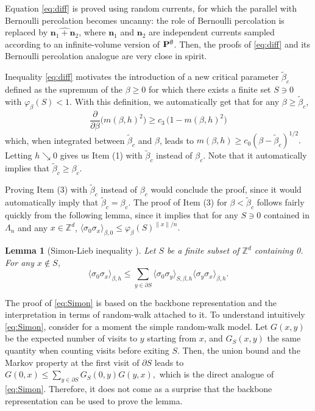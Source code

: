 \documentclass[a4paper,oneside,11pt]{article}
\newtheorem{lemma}[theorem]{Lemma}
\newcommand{\ee}{\end{equation}}
\newcommand{\be}{\begin{equation}}
\begin{document}
Equation \eqref{eq:diff} is proved using random currents, for which the parallel with Bernoulli percolation becomes uncanny: the role of Bernoulli percolation is replaced by $\widehat{\mathbf n_1+\mathbf n_2}$, where $\mathbf n_1$ and $\mathbf n_2$ are independent currents sampled according to an infinite-volume version of ${\bf P}^\emptyset$. Then, the proofs of \eqref{eq:diff} and its Bernoulli percolation analogue \cite[(1.3)]{DumTas15} are very close in spirit.

Inequality \eqref{eq:diff} motivates the introduction of a new critical parameter $\tilde\beta_c$ defined as the supremum of the $\beta\ge0$ for which there exists a finite set $S\ni0$ with $\varphi_\beta(S)<1$. With this definition, we automatically get that for any $\beta\ge \tilde\beta_c$,
\be\label{eq;diff}
\frac{\partial}{\partial \beta}\big(m(\beta,h)^2\big)\ge c_3\,\big(1-m(\beta,h)^2\big)
\ee
which, when integrated between $\tilde \beta_c$ and $\beta$, leads to 
$
m(\beta,h)\ge c_0(\beta-\tilde\beta_c)^{1/2}.
$
Letting $h\searrow 0$ gives us Item (1) with $\tilde\beta_c$ instead of $\beta_c$. Note that it automatically implies that $\tilde\beta_c\ge \beta_c$. 

Proving Item (3) with $\tilde \beta_c$ instead of $\beta_c$ would conclude the proof, since it would automatically imply that $\tilde\beta_c=\beta_c$. The proof of Item (3) for $\beta<\tilde\beta_c$ follows fairly quickly from the following lemma, since it implies that for any $S\ni 0$ contained in $\Lambda_n$ and any $x\in \mathbb Z^d$, $\langle \sigma_0\sigma_x\rangle_{\beta,0}\le \varphi_\beta(S)^{\|x\|/n}.$
 \begin{lemma}[Simon-Lieb inequality \cite{Lie80}]\label{lem:finiteCriterion:ising}
  Let $S$ be a finite subset of $\mathbb Z^d$ containing 0. For any $x\notin S$, 
\be\label{eq:Simon}\langle \sigma_0\sigma_x\rangle_{\beta,h}\le \sum_{y\in \partial S}\langle \sigma_0\sigma_y\rangle_{S,\beta,h}\langle \sigma_y\sigma_x\rangle_{\beta,h}.\ee
\end{lemma}

The proof of \eqref{eq:Simon} is based on the backbone representation and the interpretation in terms of random-walk attached to it. To understand intuitively \eqref{eq:Simon}, consider for a moment the simple random-walk model. Let $G(x,y)$ be the expected number of visits to $y$ starting from $x$, and $G_S(x,y)$ the same quantity when counting visits before exiting $S$. Then, the union bound and the Markov property at the first visit of $\partial S$ leads to 
$
G(0,x)\le \sum_{y\in \partial S} G_S(0,y)G(y,x),
$
which is the direct analogue of \eqref{eq:Simon}. Therefore, it does not come as a surprise that the backbone representation can be used to prove the lemma.
\end{document}
